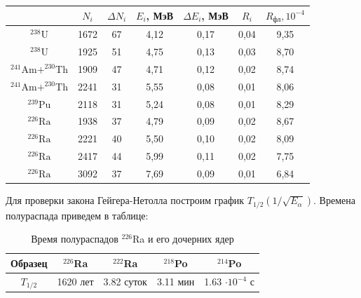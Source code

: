 \documentclass[a4paper, 12pt]{article}
\begin{document}
\begin{table}[H]
	\centering
	\begin{tabular}{|c|c|c|c|c|c|c|}
	\hline
			                                       & $N_i$ & $\Delta N_i$ & $E_i$, МэВ & $\Delta E_i$, МэВ & $R_i$ & $R_\text{фл}, 10^{-4}$ \\ \hline
	${ }^{238} \mathrm{U}$                         & 1672  & 67           & 4,12       & 0,17              & 0,04  & 9,35                  \\ \hline
	${ }^{238} \mathrm{U}$                         & 1925  & 51           & 4,75       & 0,13              & 0,03  & 8,70                  \\ \hline
	${ }^{241} \mathrm{Am} +   ^{230} \mathrm{Th}$ & 1909  & 47           & 4,71       & 0,12              & 0,02  & 8,74                  \\ \hline
	${ }^{241} \mathrm{Am} +   ^{230} \mathrm{Th}$ & 2241  & 31           & 5,55       & 0,08              & 0,01  & 8,06                  \\ \hline
	${ }^{239} \mathrm{Pu}$                        & 2118  & 31           & 5,24       & 0,08              & 0,01  & 8,29                  \\ \hline
	${ }^{226} \mathrm{Ra}$                        & 1938  & 37           & 4,79       & 0,09              & 0,02  & 8,67                  \\ \hline
	${ }^{226} \mathrm{Ra}$                        & 2221  & 40           & 5,50       & 0,10              & 0,02  & 8,09                  \\ \hline
	${ }^{226} \mathrm{Ra}$                        & 2417  & 44           & 5,99       & 0,11              & 0,02  & 7,75                  \\ \hline
	${ }^{226} \mathrm{Ra}$                        & 3092  & 37           & 7,69       & 0,09              & 0,01  & 6,84                  \\ \hline
	\end{tabular}
\end{table}

Для проверки закона Гейгера-Нетолла построим график $T_{1/2}(1/\sqrt{E_{\alpha}})$. Времена полураспада приведем в таблице:
\begin{table}[H]
    \centering
    \begin{tabular}{|c|c|c|c|c|} \hline
        Образец & $^{226}$Ra & $^{222}$Ra & $^{218}$Po & $^{214}$Po \\ \hline
        $T_{1/2}$ & 1620 лет & 3.82 суток & 3.11 мин & 1.63 $\cdot 10^{-4}$ с \\ \hline
    \end{tabular}
    \caption{Время полураспадов $^{226}$Ra и его дочерних ядер}
    \label{table:tab}
\end{table}
\end{document}
